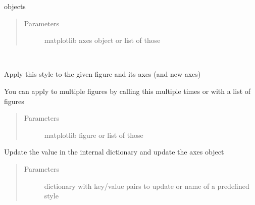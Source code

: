 \documentclass[letterpaper,10pt,openany,oneside,english]{sphinxmanual}
\begin{document}
\begin{fulllineitems}
\begin{fulllineitems}
objects
\begin{quote}\begin{description}
\item[{Parameters}] \leavevmode
{} \textendash{} matplotlib axes object or list of those

\end{description}\end{quote}

\end{fulllineitems}


\begin{fulllineitems}
\label{\detokenize{config:config.Style.apply_to_fig}}~
\begin{DUlineblock}{0em}
\item[] Apply this style to the given figure and its axes (and new axes)  
\item[] You can apply to multiple figures by calling this multiple times or with a list of figures  
\end{DUlineblock}
\begin{quote}\begin{description}
\item[{Parameters}] \leavevmode
{} \textendash{} matplotlib figure or list of those

\end{description}\end{quote}

\end{fulllineitems}


\begin{fulllineitems}
\label{\detokenize{config:config.Style.update}}
Update the value in the internal dictionary and update the axes object
\begin{quote}\begin{description}
\item[{Parameters}] \leavevmode
{} \textendash{} dictionary with key/value pairs to update or name of a predefined style

\end{description}\end{quote}


\end{fulllineitems}
\end{fulllineitems}
\end{document}

